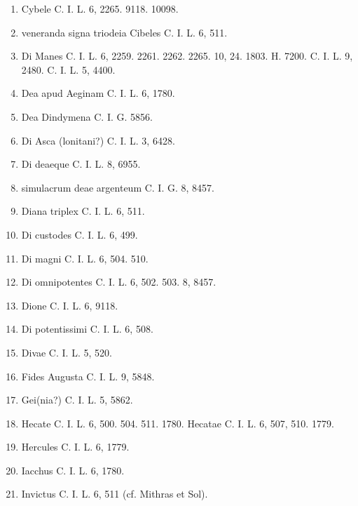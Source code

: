 \documentclass[a4paper, 11pt, oneside, polutonikogreek, german]{article}
\begin{document}
\begin{enumerate}
\item Cybele C. I. L. 6, 2265. 9118. 10098.

\item veneranda signa triodeia Cibeles C. I. L. 6, 511.

\item Di Manes C. I. L. 6, 2259. 2261. 2262. 2265. 10, 24. 1803. H. 7200. C. I. L. 9, 2480. C. I. L. 5, 4400.

\item Dea apud Aeginam C. I. L. 6, 1780.

\item Dea Dindymena C. I. G. 5856.

\item Di Asca (lonitani?) C. I. L. 3, 6428.

\item Di deaeque C. I. L. 8, 6955.

\item simulacrum deae argenteum C. I. G. 8, 8457.

\item Diana triplex C. I. L. 6, 511.

\item Di custodes C. I. L. 6, 499.

\item Di magni C. I. L. 6, 504. 510.

\item Di omnipotentes C. I. L. 6, 502. 503. 8, 8457.

\item Dione C. I. L. 6, 9118.

\item Di potentissimi C. I. L. 6, 508.

\item Divae C. I. L. 5, 520.

\item Fides Augusta C. I. L. 9, 5848.

\item Gei(nia?) C. I. L. 5, 5862.

\item Hecate C. I. L. 6, 500. 504. 511. 1780. Hecatae C. I. L. 6, 507, 510. 1779.

\item Hercules C. I. L. 6, 1779.

\item Iacchus C. I. L. 6, 1780.

\item Invictus C. I. L. 6, 511 (cf. Mithras et Sol).


\end{enumerate}
\end{document}
